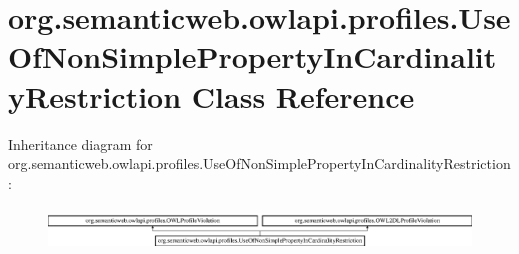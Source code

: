 \hypertarget{classorg_1_1semanticweb_1_1owlapi_1_1profiles_1_1_use_of_non_simple_property_in_cardinality_restriction}{\section{org.\-semanticweb.\-owlapi.\-profiles.\-Use\-Of\-Non\-Simple\-Property\-In\-Cardinality\-Restriction Class Reference}
\label{classorg_1_1semanticweb_1_1owlapi_1_1profiles_1_1_use_of_non_simple_property_in_cardinality_restriction}
}
Inheritance diagram for org.\-semanticweb.\-owlapi.\-profiles.\-Use\-Of\-Non\-Simple\-Property\-In\-Cardinality\-Restriction\-:\begin{figure}[H]
\begin{center}
\leavevmode
\includegraphics[height=1.169102cm]{classorg_1_1semanticweb_1_1owlapi_1_1profiles_1_1_use_of_non_simple_property_in_cardinality_restriction}
\end{center}
\end{figure}
